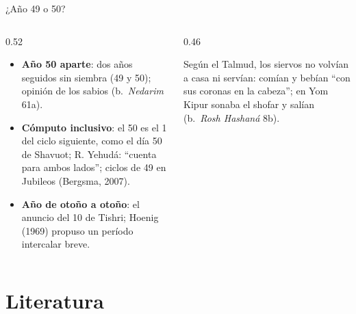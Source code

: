 \begin{frame}{¿Año 49 o 50?}
\begin{columns}[t,onlytextwidth]
\begin{column}{0.52\textwidth}\scriptsize
\begin{itemize}
\item \textbf{Año 50 aparte}: dos años seguidos sin siembra (49 y 50); opinión de los sabios (b.~\emph{Nedarim} 61a).
\item \textbf{Cómputo inclusivo}: el 50 es el 1 del ciclo siguiente, como el día 50 de Shavuot; R. Yehudá: ``cuenta para ambos lados''; ciclos de 49 en Jubileos (Bergsma, 2007).
\item \textbf{Año de otoño a otoño}: el anuncio del 10 de Tishri; Hoenig (1969) propuso un período intercalar breve.
\end{itemize}
\end{column}
\begin{column}{0.46\textwidth}
\begin{tcolorbox}[colback=papiro,colframe=mostaza!85!tierraroja,boxrule=0.8pt,arc=2pt,left=3pt,right=3pt,title={Del 1 al 10 de Tishri},fonttitle=\scriptsize\bfseries,coltitle=caferojizo,colbacktitle=mostaza!35]
\scriptsize\RaggedRight Según el Talmud, los siervos no volvían a casa ni servían: comían y bebían ``con sus coronas en la cabeza''; en Yom Kipur sonaba el shofar y salían (b.~\emph{Rosh Hashaná} 8b).
\end{tcolorbox}
\par\justifying{}
\end{column}
\end{columns}
\end{frame}

\section{Literatura}

